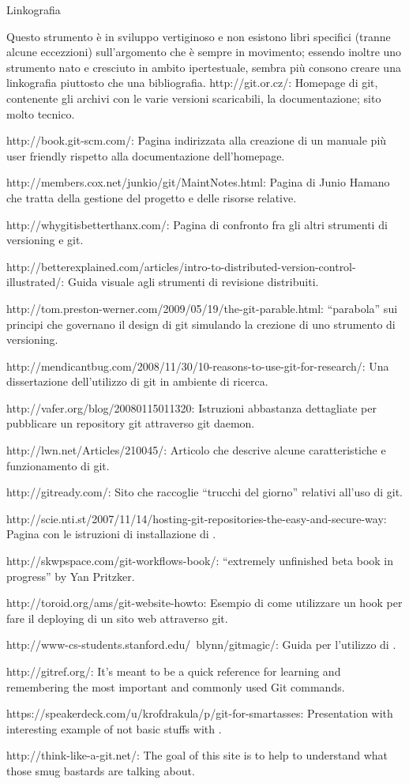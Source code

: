 \capitolo Linkografia

Questo strumento \`e in sviluppo vertiginoso e non esistono libri specifici
(tranne alcune eccezzioni) sull'argomento che \`e sempre in movimento; essendo
inoltre uno strumento nato e cresciuto in ambito ipertestuale, sembra pi\`u
consono creare una linkografia piuttosto che una bibliografia.
\bigskip
\link http://git.or.cz/: Homepage di git, contenente gli archivi con le varie
versioni scaricabili, la documentazione; sito molto tecnico.

\link http://book.git-scm.com/: Pagina indirizzata alla creazione di un manuale
pi\`u user friendly rispetto alla documentazione dell'homepage.

\link http://members.cox.net/junkio/git/MaintNotes.html: Pagina di Junio Hamano che tratta della gestione del progetto e delle risorse relative.

\link http://whygitisbetterthanx.com/: Pagina di confronto fra gli altri
strumenti di versioning e git.

\link
http://betterexplained.com/articles/intro-to-distributed-version-control-illustrated/:
Guida visuale agli strumenti di revisione distribuiti.

\link http://tom.preston-werner.com/2009/05/19/the-git-parable.html:
``parabola'' sui principi che governano il design di git simulando la crezione di uno
strumento di versioning.

\link http://mendicantbug.com/2008/11/30/10-reasons-to-use-git-for-research/:
Una dissertazione dell'utilizzo di git in ambiente di ricerca.

\link http://vafer.org/blog/20080115011320:
Istruzioni abbastanza dettagliate per pubblicare un repository git attraverso
git daemon.

\link http://lwn.net/Articles/210045/: Articolo che descrive alcune
caratteristiche e funzionamento di git.

\link http://gitready.com/: Sito che raccoglie ``trucchi del giorno''
relativi all'uso di git.

\link
http://scie.nti.st/2007/11/14/hosting-git-repositories-the-easy-and-secure-way: Pagina con le istruzioni di installazione di .

\link http://skwpspace.com/git-workflows-book/: ``extremely unfinished beta book
in progress'' by Yan Pritzker.

\link http://toroid.org/ams/git-website-howto: Esempio di come utilizzare un
hook per fare il deploying di un sito web attraverso git.

\link http://www-cs-students.stanford.edu/~blynn/gitmagic/: Guida per l'utilizzo
di .

\link http://gitref.org/: It's meant to be a quick reference for learning and remembering the most important and commonly used Git commands.

\link https://speakerdeck.com/u/krofdrakula/p/git-for-smartasses: Presentation
with interesting example of not basic stuffs with .

\link http://think-like-a-git.net/: The goal of this site is to help to understand what those smug bastards are talking about.

\vfill\eject
